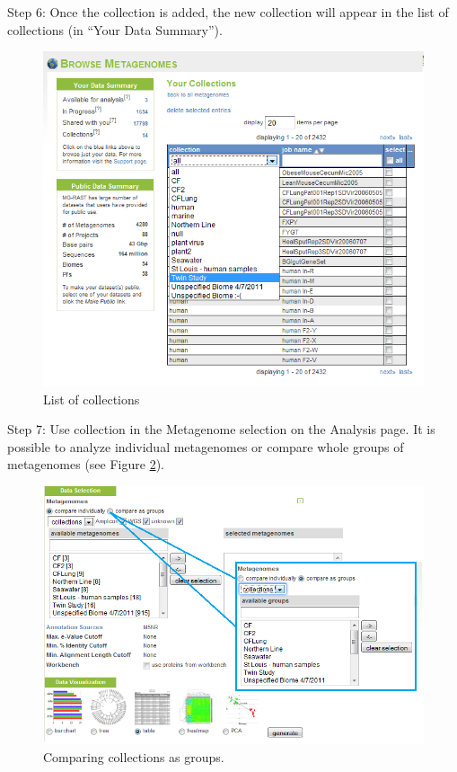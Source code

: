 \documentclass[12pt,fullpage]{report}
\begin{document}
Step 6: Once the collection is added, the new collection will appear in the list of collections (in ``Your Data Summary'').

\begin{figure}[ht]
\begin{center}
\includegraphics[width=6in]{Images/collections-finished.png}
\end{center}
\caption{
List of collections}
\label{fig:collections-finished}
\end{figure}

Step 7: Use collection in the Metagenome selection on the Analysis page. It is possible to analyze individual metagenomes or compare whole groups of metagenomes (see Figure \ref{fig:using-collections}).

\begin{figure}[ht]
\begin{center}
\includegraphics[width=6in]{Images/using-collections.png}
\end{center}
\caption{
Comparing collections as groups.}
\label{fig:using-collections}
\end{figure}
\end{document}
